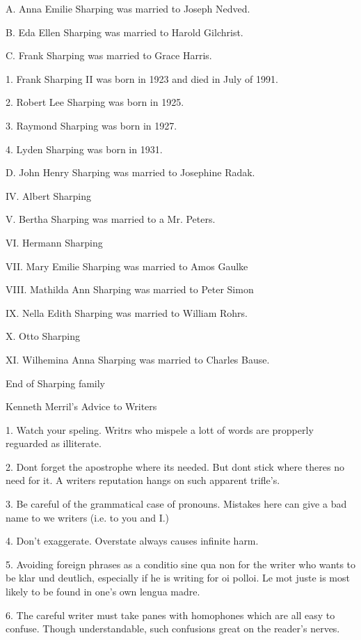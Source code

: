 \documentclass[a4paper]{article}
\begin{document}
A. Anna Emilie Sharping was married to Joseph Nedved.

B. Eda Ellen Sharping was married to Harold Gilchrist.  

C. Frank Sharping was married to Grace Harris.

1. Frank Sharping II was born in 1923 and died in July of 1991.

2. Robert Lee Sharping was born in 1925.

3. Raymond Sharping was born in 1927.

4. Lyden Sharping was born in 1931.

D. John Henry Sharping was married to Josephine Radak.

IV. Albert Sharping

V. Bertha Sharping was married to a Mr. Peters.

VI. Hermann Sharping

VII. Mary Emilie Sharping was married to Amos Gaulke

VIII. Mathilda Ann Sharping was married to Peter Simon

IX. Nella Edith Sharping was married to William Rohrs.

X. Otto Sharping

XI.  Wilhemina Anna Sharping was married to Charles Bause.

\vskip 4mm
End of Sharping family
\pagebreak

{\Huge \noindent Kenneth Merril's Advice to Writers}
\vskip 5mm


1. Watch your speling.  Writrs who mispele a lott of words are propperly reguarded as illiterate.

2. Dont forget the apostrophe where its needed.  But dont stick where theres no need for it. A writers reputation hangs on such apparent trifle's.  

3. Be careful of the grammatical case of pronouns.  Mistakes here can give a bad name to we writers (i.e. to you and I.)

4. Don't exaggerate.  Overstate always causes infinite harm.

5. Avoiding foreign phrases as a conditio sine qua non for the writer who wants to be klar und deutlich, especially if he is writing for oi polloi.  Le mot juste is most likely to be found in one's own lengua madre.  

6. The careful writer must take panes with homophones which are all easy to confuse.  Though understandable, such confusions great on the reader's nerves.
\end{document}
